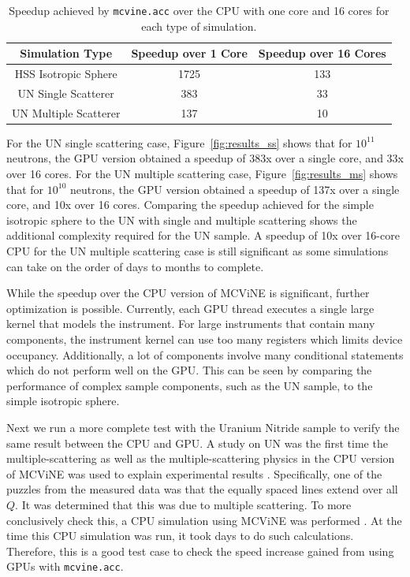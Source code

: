 \begin{table}[h]
    \centering
    \begin{tabular}{c|c|c}
        Simulation Type & Speedup over 1 Core & Speedup over 16 Cores \\
        \hline
        HSS Isotropic Sphere & 1725 & 133 \\
        UN Single Scatterer & 383 & 33 \\
        UN Multiple Scatterer & 137 & 10 \\
        \hline
    \end{tabular}
    \caption{Speedup achieved by \texttt{mcvine.acc} over the CPU with one core and 16 cores for each type of simulation.}
    \label{tab:speedup}
\end{table}


For the UN single scattering case, Figure~\ref{fig:results_ss} shows that for $10^{11}$ neutrons, the GPU version obtained a speedup of 383x over a single core, and 33x over 16 cores. For the UN multiple scattering case, Figure~\ref{fig:results_ms} shows that for $10^{10}$ neutrons, the GPU version obtained a speedup of 137x over a single core, and 10x over 16 cores. Comparing the speedup achieved for the simple isotropic sphere to the UN with single and multiple scattering shows the additional complexity required for the UN sample. A speedup of 10x over 16-core CPU for the UN multiple scattering case is still significant as some simulations can take on the order of days to months to complete.

While the speedup over the CPU version of MCViNE is significant, further optimization is possible. Currently, each GPU thread executes a single large kernel that models the instrument. For large instruments that contain many components, the instrument kernel can use too many registers which limits device occupancy. Additionally, a lot of components involve many conditional statements which do not perform well on the GPU. This can be seen by comparing the performance of complex sample components, such as the UN sample, to the simple isotropic sphere.

Next we run a more complete test with the Uranium Nitride sample to verify the same result between the CPU and GPU.
A study on UN was the first time the multiple-scattering as well as the multiple-scattering physics in the CPU version of MCViNE was used to explain experimental results \cite{lin2014UN}. Specifically, one of the puzzles from the measured data was that the equally spaced lines extend over all $Q$.  It was determined that this was due to multiple scattering.
To more conclusively check this, a CPU simulation using MCViNE was performed \cite{lin2014UN}.  At the time this CPU simulation was run, it took days to do such calculations.  Therefore, this is a good test case to check the speed increase gained from using GPUs with \texttt{mcvine.acc}.

